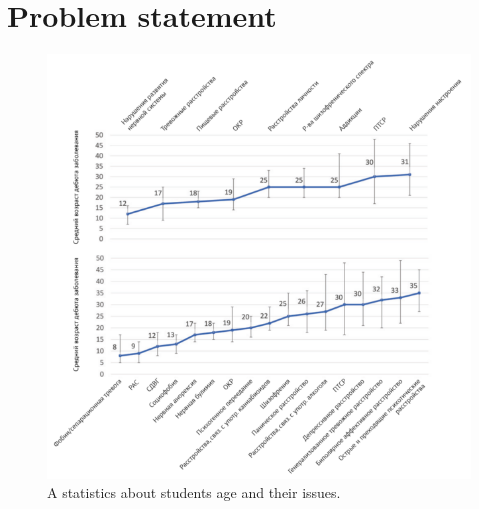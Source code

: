 \section{Problem statement}\label{prblstatm}
\begin{figure}[ht]\label{fig:sstats}
  \centering
  \includegraphics[width=0.8\linewidth]{figures/Students_issue.png}
  \caption{A statistics about students age and their issues.}
\end{figure}

